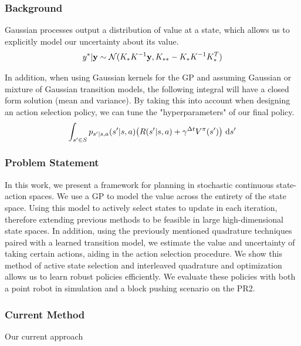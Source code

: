 \documentclass[8pt]{beamer}
\begin{document}
\begin{frame}
\frametitle{Background}
Gaussian processes output a distribution of value at a state, which allows us to explicitly model our uncertainty about its value.
\begin{equation*}    %
	y^{*}|\bold{y} \sim \mathcal{N}(K_{*}K^{-1}\bold{y}, K_{**} - K_{*}K^{-1}K_{*}^{T})
\end{equation*}

In addition, when using Gaussian kernels for the GP and assuming Gaussian or mixture of Gaussian transition models, the following integral will have a closed form solution (mean and variance). By taking this into account when designing an action selection policy, we can tune the "hyperparameters" of our final policy.
\begin{equation*}    %
        \int_{s' \in S} p_{s'|s,a}(s'|s,a)\big(R(s'|s,a) + \gamma^{\Delta t}V^{\pi}(s')\big) \ \textup{d}s'
\end{equation*}
\end{frame}

\begin{frame}
\frametitle{Problem Statement}
In this work, we present a framework for planning in stochastic continuous state-action spaces. We use a GP to model the value across the entirety of the state space. Using this model to actively select states to update in each iteration, therefore extending previous methods to be feasible in large high-dimensional state spaces. In addition, using the previously mentioned quadrature techniques paired with a learned transition model, we estimate the value and uncertainty of taking certain actions, aiding in the action selection procedure. We show this method of active state selection and interleaved quadrature and optimization allows us to learn robust policies efficiently. We evaluate these policies with both a point robot in simulation and a block pushing scenario on the PR2.
\end{frame}

\begin{frame}
\frametitle{Current Method}
Our current approach
\end{frame}
 
\end{document}
